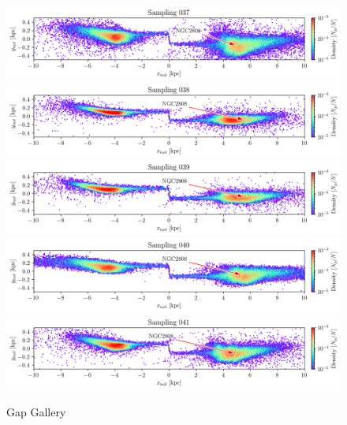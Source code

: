 \documentclass{aa}
\begin{document}
\begin{appendix}
    \begin{figure}
      \centering
      \includegraphics[width=\linewidth]{gallery_of_gaps_monte-carlo-037.png}
      \includegraphics[width=\linewidth]{gallery_of_gaps_monte-carlo-038.png}
      \includegraphics[width=\linewidth]{gallery_of_gaps_monte-carlo-039.png}
      \includegraphics[width=\linewidth]{gallery_of_gaps_monte-carlo-040.png}
      \includegraphics[width=\linewidth]{gallery_of_gaps_monte-carlo-041.png}      
      \caption{Gap Gallery}
      \label{fig:gallery9}
    \end{figure}        
    

\end{appendix}
\end{document}
